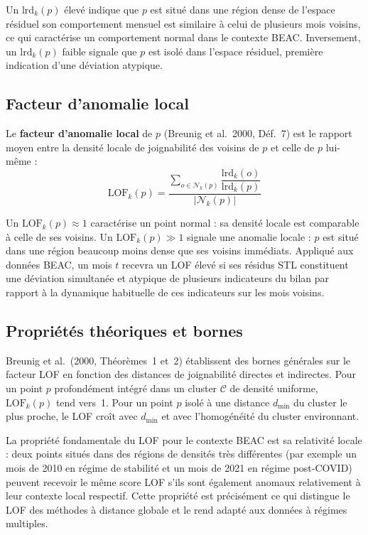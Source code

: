 \documentclass[12pt,a4paper]{article}
\begin{document}
Un $\mathrm{lrd}_k(p)$ élevé indique que $p$ est situé dans une région dense
de l'espace résiduel  son comportement mensuel est similaire à celui de
plusieurs mois voisins, ce qui caractérise un comportement normal dans le
contexte BEAC. Inversement, un $\mathrm{lrd}_k(p)$ faible signale que $p$ est
isolé dans l'espace résiduel, première indication d'une déviation atypique.

\subsection{Facteur d'anomalie local}

Le \textbf{facteur d'anomalie local} de $p$ (Breunig et al.\ 2000, Déf.~7)
est le rapport moyen entre la densité locale de joignabilité des voisins de
$p$ et celle de $p$ lui-même :
$$\mathrm{LOF}_k(p) =
\frac{\displaystyle\sum_{o \in \mathcal{N}_k(p)}
\dfrac{\mathrm{lrd}_k(o)}{\mathrm{lrd}_k(p)}}
{\left|\mathcal{N}_k(p)\right|}$$

Un $\mathrm{LOF}_k(p) \approx 1$ caractérise un point normal : sa densité
locale est comparable à celle de ses voisins. Un $\mathrm{LOF}_k(p) \gg 1$
signale une anomalie locale : $p$ est situé dans une région beaucoup moins
dense que ses voisins immédiats. Appliqué aux données BEAC, un mois $t$
recevra un LOF élevé si ses résidus STL constituent une déviation simultanée
et atypique de plusieurs indicateurs du bilan par rapport à la dynamique
habituelle de ces indicateurs sur les mois voisins.

\subsection{Propriétés théoriques et bornes}

Breunig et al.\ (2000, Théorèmes~1 et~2) établissent des bornes générales
sur le facteur LOF en fonction des distances de joignabilité directes et
indirectes. Pour un point $p$ profondément intégré dans un cluster
$\mathcal{C}$ de densité uniforme, $\mathrm{LOF}_k(p)$ tend vers~1. Pour un
point $p$ isolé à une distance $d_{\min}$ du cluster le plus proche, le LOF
croît avec $d_{\min}$ et avec l'homogénéité du cluster environnant.

La propriété fondamentale du LOF pour le contexte BEAC est sa relativité
locale : deux points situés dans des régions de densités très différentes
(par exemple un mois de 2010 en régime de stabilité et un mois de 2021 en
régime post-COVID) peuvent recevoir le même score LOF s'ils sont également
anomaux relativement à leur contexte local respectif. Cette propriété est
précisément ce qui distingue le LOF des méthodes à distance globale et le
rend adapté aux données à régimes multiples.
\end{document}
